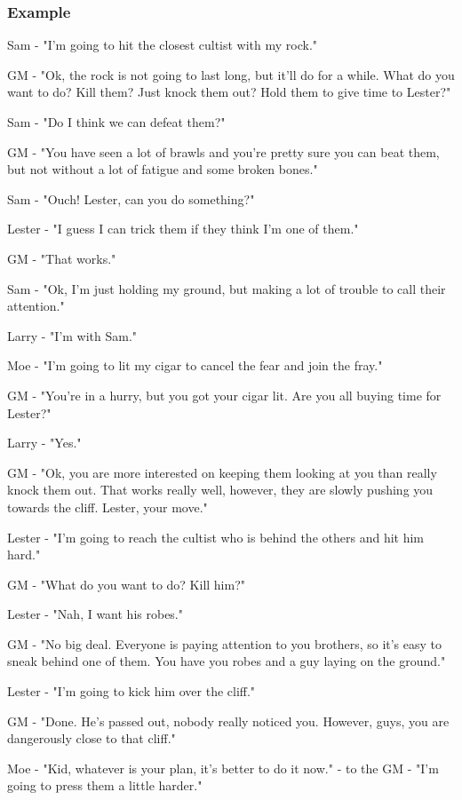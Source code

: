 \documentclass[11pt]{article}
\begin{document}
\subsubsection{Example}
\label{sec:org0a9b144}

Sam - "I'm going to hit the closest cultist with my rock."

GM - "Ok, the rock is not going to last long, but it'll do for a while. What do you want to do? Kill them? Just knock them out? Hold them to give time to Lester?"

Sam - "Do I think we can defeat them?"

GM - "You have seen a lot of brawls and you're pretty sure you can beat them, but not without a lot of fatigue and some broken bones."

Sam - "Ouch! Lester, can you do something?"

Lester - "I guess I can trick them if they think I'm one of them."

GM - "That works."

Sam - "Ok, I'm just holding my ground, but making a lot of trouble to call their attention."

Larry - "I'm with Sam."

Moe - "I'm going to lit my cigar to cancel the fear and join the fray."

GM - "You're in a hurry, but you got your cigar lit. Are you all buying time for Lester?"

Larry - "Yes."

GM - "Ok, you are more interested on keeping them looking at you than really knock them out. That works really well, however, they are slowly pushing you towards the cliff. Lester, your move."

Lester - "I'm going to reach the cultist who is behind the others and hit him hard."

GM - "What do you want to do? Kill him?"

Lester - "Nah, I want his robes."

GM - "No big deal. Everyone is paying attention to you brothers, so it's easy to sneak behind one of them. You have you robes and a guy laying on the ground."

Lester - "I'm going to kick him over the cliff."

GM - "Done. He's passed out, nobody really noticed you. However, guys, you are dangerously close to that cliff."

Moe - "Kid, whatever is your plan, it's better to do it now." - to the GM - "I'm going to press them a little harder."
\end{document}
